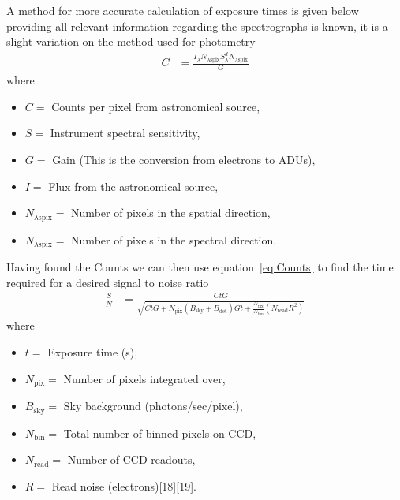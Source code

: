 	A method for more accurate calculation of exposure times is given below providing all relevant information regarding the spectrographs is known, it is a slight variation on the method used for photometry
	\begin{align}
		C &= \frac{I_\lambda N_{\lambda \text{spix}}S_\lambda^d N_{\lambda \text{spix}}}{G}
	\end{align}
	where
	\begin{itemize}
		\item $C =$ Counts per pixel from astronomical source,
		\item $S =$ Instrument spectral sensitivity,
		\item $G =$ Gain (This is the conversion from electrons to ADUs),
		\item $I =$ Flux from the astronomical source,
		\item $N_{\lambda \text{spix}} =$ Number of pixels in the spatial direction,
		\item $N_{\lambda \text{spix}} =$ Number of pixels in the spectral direction.
	\end{itemize}
	Having found the Counts we can then use equation~\ref{eq:Counts}\cite{Counts} to find the time required for a desired signal to noise ratio
	\begin{align}
		\frac{S}{N} &= \frac{CtG}{\sqrt{CtG + N_\text{pix}(B_\text{sky} + B_\text{det}) Gt + \frac{N_\text{pix}}{N_\text{bin}}(N_\text{read} R^2)}} \label{eq:Counts}
	\end{align}
	where
	\begin{itemize}
		\item $t =$ Exposure time (s),
		\item $N_\text{pix} =$ Number of pixels integrated over,
		\item $B_\text{sky} =$ Sky background (photons/sec/pixel),
		\item $N_\text{bin} =$ Total number of binned pixels on CCD,
		\item $N_\text{read} =$ Number of CCD readouts,
		\item $R =$ Read noise (electrons)\cite{}[18]\cite{}[19].
	\end{itemize}
